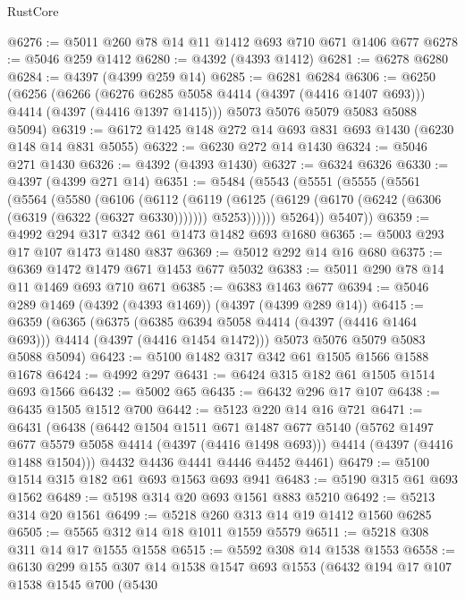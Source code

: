 \begin{lexlean}{RustCore}
\begin{coremodule}
@6276 := @5011 @260 @78 @14 @11 @1412 @693 @710 @671 @1406 @677
@6278 := @5046 @259 @1412
@6280 := @4392 (@4393 @1412)
@6281 := @6278 @6280
@6284 := @4397 (@4399 @259 @14)
@6285 := @6281 @6284
@6306 := @6250
    (@6256
      (@6266 (@6276 @6285 @5058 @4414 (@4397 (@4416 @1407 @693))) @4414 (@4397 (@4416 @1397 @1415)))
      @5073
      @5076
      @5079
      @5083
      @5088
      @5094)
@6319 := @6172 @1425 @148 @272 @14 @693 @831 @693 @1430 (@6230 @148 @14 @831 @5055)
@6322 := @6230 @272 @14 @1430
@6324 := @5046 @271 @1430
@6326 := @4392 (@4393 @1430)
@6327 := @6324 @6326
@6330 := @4397 (@4399 @271 @14)
@6351 := @5484
    (@5543
      (@5551
        (@5555
          (@5561
            (@5564
              (@5580
                (@6106
                  (@6112
                    (@6119
                      (@6125
                        (@6129 (@6170 (@6242 (@6306 (@6319 (@6322 (@6327 @6330)))))))
                        @5253))))))
            @5264))
        @5407))
@6359 := @4992 @294 @317 @342 @61 @1473 @1482 @693 @1680
@6365 := @5003 @293 @17 @107 @1473 @1480 @837
@6369 := @5012 @292 @14 @16 @680
@6375 := @6369 @1472 @1479 @671 @1453 @677 @5032
@6383 := @5011 @290 @78 @14 @11 @1469 @693 @710 @671
@6385 := @6383 @1463 @677
@6394 := @5046 @289 @1469 (@4392 (@4393 @1469)) (@4397 (@4399 @289 @14))
@6415 := @6359
    (@6365
      (@6375 (@6385 @6394 @5058 @4414 (@4397 (@4416 @1464 @693))) @4414 (@4397 (@4416 @1454 @1472)))
      @5073
      @5076
      @5079
      @5083
      @5088
      @5094)
@6423 := @5100 @1482 @317 @342 @61 @1505 @1566 @1588 @1678
@6424 := @4992 @297
@6431 := @6424 @315 @182 @61 @1505 @1514 @693 @1566
@6432 := @5002 @65
@6435 := @6432 @296 @17 @107
@6438 := @6435 @1505 @1512 @700
@6442 := @5123 @220 @14 @16 @721
@6471 := @6431
    (@6438
      (@6442
        @1504
        @1511
        @671
        @1487
        @677
        @5140
        (@5762 @1497 @677 @5579 @5058 @4414 (@4397 (@4416 @1498 @693)))
        @4414
        (@4397 (@4416 @1488 @1504)))
      @4432
      @4436
      @4441
      @4446
      @4452
      @4461)
@6479 := @5100 @1514 @315 @182 @61 @693 @1563 @693 @941
@6483 := @5190 @315 @61 @693 @1562
@6489 := @5198 @314 @20 @693 @1561 @883 @5210
@6492 := @5213 @314 @20 @1561
@6499 := @5218 @260 @313 @14 @19 @1412 @1560 @6285
@6505 := @5565 @312 @14 @18 @1011 @1559 @5579
@6511 := @5218 @308 @311 @14 @17 @1555 @1558
@6515 := @5592 @308 @14 @1538 @1553
@6558 := @6130
    @299
    @155
    @307
    @14
    @1538
    @1547
    @693
    @1553
    (@6432
      @194
      @17
      @107
      @1538
      @1545
      @700
      (@5430

\end{coremodule}
\end{lexlean}
